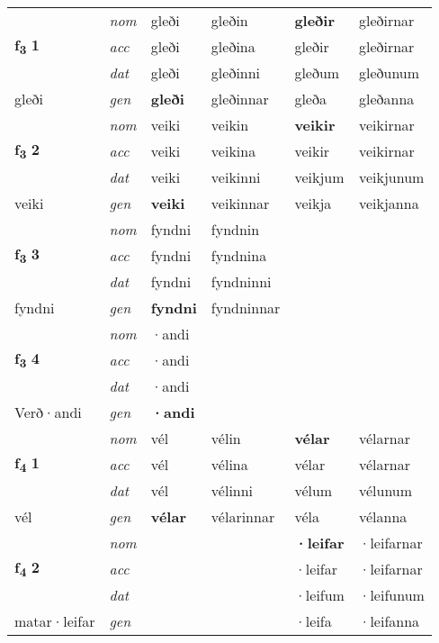 \begin{longtable}[l]{X>{\footnotesize\itshape}XXXXX}
\multirow{3}{*}{{{\textbf{f{\textsubscript{3}}} \Large{\textbf{1}}}}} & nom & gleði & gleðin & \textbf{gleðir} & gleðirnar \\*
 & acc & gleði & gleðina & gleðir & gleðirnar \\*
 & dat & gleði & gleðinni & gleðum & gleðunum \\*
 {\footnotesize{gleði}} & gen & \textbf{gleði} & gleðinnar & gleða & gleðanna \\
\cmidrule{1-6}

\multirow{3}{*}{{{\textbf{f{\textsubscript{3}}} \Large{\textbf{2}}}}} & nom & veiki & veikin & \textbf{veikir} & veikirnar \\*
 & acc & veiki & veikina & veikir & veikirnar \\*
 & dat & veiki & veikinni & veikjum & veikjunum \\*
 {\footnotesize{veiki}} & gen & \textbf{veiki} & veikinnar & veikja & veikjanna \\
\cmidrule{1-6}

\multirow{3}{*}{{{\textbf{f{\textsubscript{3}}} \Large{\textbf{3}}}}} & nom & fyndni & fyndnin & \textbf{} &  \\*
 & acc & fyndni & fyndnina &  &  \\*
 & dat & fyndni & fyndninni &  &  \\*
 {\footnotesize{fyndni}} & gen & \textbf{fyndni} & fyndninnar &  &  \\
\cmidrule{1-6}

\multirow{3}{*}{{{\textbf{f{\textsubscript{3}}} \Large{\textbf{4}}}}} & nom & ·andi &  & \textbf{} &  \\*
 & acc & ·andi &  &  &  \\*
 & dat & ·andi &  &  &  \\*
 {\footnotesize{Verð\allowbreak ·andi}} & gen & \textbf{·andi} &  &  &  \\

\multirow{3}{*}{{{\textbf{f{\textsubscript{4}}} \Large{\textbf{1}}}}} & nom & vél & vélin & \textbf{vélar} & vélarnar \\*
 & acc & vél & vélina & vélar & vélarnar \\*
 & dat & vél & vélinni & vélum & vélunum \\*
 {\footnotesize{vél}} & gen & \textbf{vélar} & vélarinnar & véla & vélanna \\
\cmidrule{1-6}

\multirow{3}{*}{{{\textbf{f{\textsubscript{4}}} \Large{\textbf{2}}}}} & nom &  &  & \textbf{·leifar} & ·leifarnar \\*
 & acc &  &  & ·leifar & ·leifarnar \\*
 & dat &  &  & ·leifum & ·leifunum \\*
 {\footnotesize{matar\allowbreak ·leifar}} & gen & \textbf{} &  & ·leifa & ·leifanna \\
\cmidrule{1-6}


\end{longtable}
